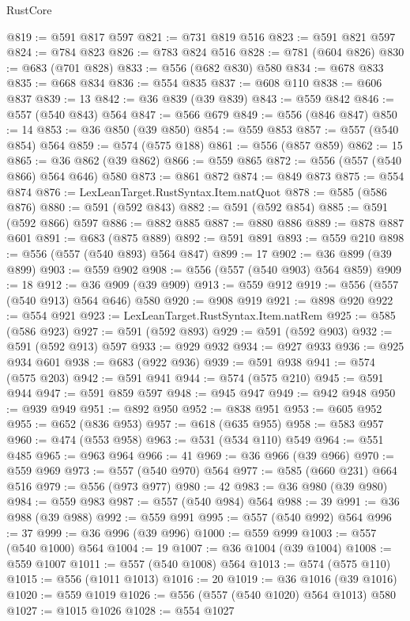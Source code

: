 \begin{lexlean}{RustCore}
\begin{coremodule}
@819 := @591 @817 @597
@821 := @731 @819 @516
@823 := @591 @821 @597
@824 := @784 @823
@826 := @783 @824 @516
@828 := @781 (@604 @826)
@830 := @683 (@701 @828)
@833 := @556 (@682 @830) @580
@834 := @678 @833
@835 := @668 @834
@836 := @554 @835
@837 := @608 @110
@838 := @606 @837
@839 := 13
@842 := @36 @839 (@39 @839)
@843 := @559 @842
@846 := @557 (@540 @843) @564
@847 := @566 @679
@849 := @556 (@846 @847)
@850 := 14
@853 := @36 @850 (@39 @850)
@854 := @559 @853
@857 := @557 (@540 @854) @564
@859 := @574 (@575 @188)
@861 := @556 (@857 @859)
@862 := 15
@865 := @36 @862 (@39 @862)
@866 := @559 @865
@872 := @556 (@557 (@540 @866) @564 @646) @580
@873 := @861 @872
@874 := @849 @873
@875 := @554 @874
@876 := LexLeanTarget.RustSyntax.Item.natQuot
@878 := @585 (@586 @876)
@880 := @591 (@592 @843)
@882 := @591 (@592 @854)
@885 := @591 (@592 @866) @597
@886 := @882 @885
@887 := @880 @886
@889 := @878 @887 @601
@891 := @683 (@875 @889)
@892 := @591 @891
@893 := @559 @210
@898 := @556 (@557 (@540 @893) @564 @847)
@899 := 17
@902 := @36 @899 (@39 @899)
@903 := @559 @902
@908 := @556 (@557 (@540 @903) @564 @859)
@909 := 18
@912 := @36 @909 (@39 @909)
@913 := @559 @912
@919 := @556 (@557 (@540 @913) @564 @646) @580
@920 := @908 @919
@921 := @898 @920
@922 := @554 @921
@923 := LexLeanTarget.RustSyntax.Item.natRem
@925 := @585 (@586 @923)
@927 := @591 (@592 @893)
@929 := @591 (@592 @903)
@932 := @591 (@592 @913) @597
@933 := @929 @932
@934 := @927 @933
@936 := @925 @934 @601
@938 := @683 (@922 @936)
@939 := @591 @938
@941 := @574 (@575 @203)
@942 := @591 @941
@944 := @574 (@575 @210)
@945 := @591 @944
@947 := @591 @859 @597
@948 := @945 @947
@949 := @942 @948
@950 := @939 @949
@951 := @892 @950
@952 := @838 @951
@953 := @605 @952
@955 := @652 (@836 @953)
@957 := @618 (@635 @955)
@958 := @583 @957
@960 := @474 (@553 @958)
@963 := @531 (@534 @110) @549
@964 := @551 @485
@965 := @963 @964
@966 := 41
@969 := @36 @966 (@39 @966)
@970 := @559 @969
@973 := @557 (@540 @970) @564
@977 := @585 (@660 @231) @664 @516
@979 := @556 (@973 @977)
@980 := 42
@983 := @36 @980 (@39 @980)
@984 := @559 @983
@987 := @557 (@540 @984) @564
@988 := 39
@991 := @36 @988 (@39 @988)
@992 := @559 @991
@995 := @557 (@540 @992) @564
@996 := 37
@999 := @36 @996 (@39 @996)
@1000 := @559 @999
@1003 := @557 (@540 @1000) @564
@1004 := 19
@1007 := @36 @1004 (@39 @1004)
@1008 := @559 @1007
@1011 := @557 (@540 @1008) @564
@1013 := @574 (@575 @110)
@1015 := @556 (@1011 @1013)
@1016 := 20
@1019 := @36 @1016 (@39 @1016)
@1020 := @559 @1019
@1026 := @556 (@557 (@540 @1020) @564 @1013) @580
@1027 := @1015 @1026
@1028 := @554 @1027

\end{coremodule}
\end{lexlean}
